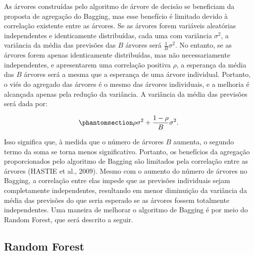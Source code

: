 \documentclass[
  12pt,
  a4paper,
]{scrreprt}
\begin{document}
\vspace{12pt}

As árvores construídas pelo algoritmo de árvore de decisão se beneficiam
da proposta de agregação do Bagging, mas esse benefício é limitado
devido à correlação existente entre as árvores. Se as árvores forem
variáveis aleatórias independentes e identicamente distribuídas, cada
uma com variância \(\sigma^2\), a variância da média das previsões das
\(B\) árvores será \(\frac{1}{B} \sigma^2\). No entanto, se as árvores
forem apenas identicamente distribuídas, mas não necessariamente
independentes, e apresentarem uma correlação positiva \(\rho\), a
esperança da média das \(B\) árvores será a mesma que a esperança de uma
árvore individual. Portanto, o viés do agregado das árvores é o mesmo
das árvores individuais, e a melhoria é alcançada apenas pela redução da
variância. A variância da média das previsões será dada por:

\begin{equation}\phantomsection\label{eq-cor}{
\rho \sigma^2 + \frac{1 - \rho}{B}\sigma^2\text{.}
}\end{equation}

Isso significa que, à medida que o número de árvores \(B\) aumenta, o
segundo termo da soma se torna menos significativo. Portanto, os
benefícios da agregação proporcionados pelo algoritmo de Bagging são
limitados pela correlação entre as árvores (HASTIE et al., 2009). Mesmo
com o aumento do número de árvores no Bagging, a correlação entre elas
impede que as previsões individuais sejam completamente independentes,
resultando em menor diminuição da variância da média das previsões do
que seria esperado se as árvores fossem totalmente independentes. Uma
maneira de melhorar o algoritmo de Bagging é por meio do Random Forest,
que será descrito a seguir.

\subsection{Random Forest}\label{random-forest}
\end{document}
